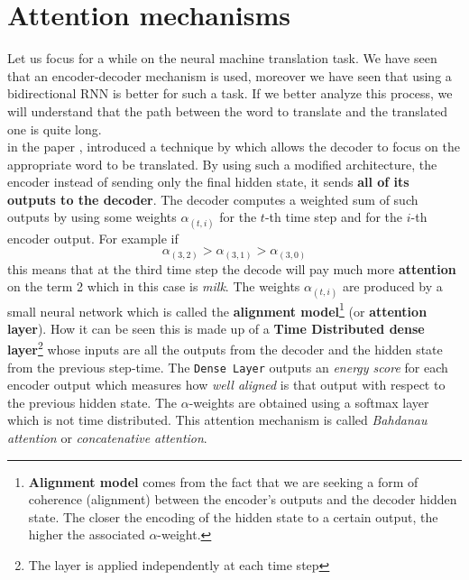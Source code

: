 \section{Attention mechanisms}
Let us focus for a while on the neural machine translation task. We have seen that an encoder-decoder mechanism is used, moreover we have seen that using a bidirectional RNN is better for such a task. If we better analyze this process, we will understand that the path between the word to translate and the translated one is quite long. \\
\citeauthor{bahdanau2014neural} in the paper \cite{bahdanau2014neural}, introduced a technique by which allows the decoder to focus on the appropriate word to be translated. By using such a modified architecture, the encoder instead of sending only the final hidden state, it sends \textbf{all of its outputs to the decoder}. The decoder computes a weighted sum of such outputs by using some weights $\alpha_{(t,i)}$ for the $t$-th time step and  for the $i$-th encoder output. For example if
\begin{equation*}
    \alpha_{(3,2)} > \alpha_{(3,1)} > \alpha_{(3,0)}
\end{equation*}
this means that at the third time step the decode will pay much more \textbf{attention} on the term 2 which in this case is \textit{milk}. The weights $\alpha_{(t,i)}$ are produced by a small neural network which is called the \textbf{alignment model}\footnote{
    \textbf{Alignment model} comes from the fact that we are seeking a form of coherence (alignment) between the encoder's outputs and the decoder hidden state. The closer the encoding of the hidden state to a certain output, the higher the associated $\alpha$-weight.
} (or \textbf{attention layer}). How it can be seen this is made up of a \textbf{Time Distributed dense layer}\footnote{
    The layer is applied independently at each time step
} whose inputs are all the outputs from the decoder and the hidden state from the previous step-time. The \texttt{Dense Layer} outputs an \textit{energy score} for each encoder output which measures how \textit{well aligned} is that output with respect to the previous hidden state. The $\alpha$-weights are obtained using a softmax layer which is not time distributed. This attention mechanism is called \textit{Bahdanau attention} or \textit{concatenative attention}.

